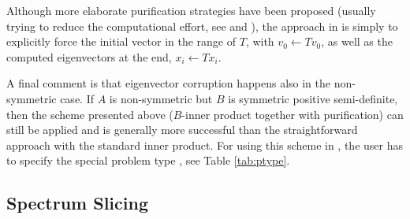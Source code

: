 Although more elaborate purification strategies have been proposed (usually trying to reduce the computational effort, see \citep{Nour-Omid:1987:HIS} and \citep{Meerbergen:1997:IRA}), the approach in \slepc is simply to explicitly force the initial vector in the range of $T$, with $v_0\leftarrow Tv_0$, as well as the computed eigenvectors at the end, $x_i\leftarrow Tx_i$.

A final comment is that eigenvector corruption happens also in the non-symmetric case. If $A$ is non-symmetric but $B$ is symmetric positive semi-definite, then the scheme presented above ($B$-inner product together with purification) can still be applied and is generally more successful than the straightforward approach with the standard inner product. For using this scheme in \slepc, the user has to specify the special problem type , see Table \ref{tab:ptype}.

\subsection{Spectrum Slicing}
\label{sec:slice}

